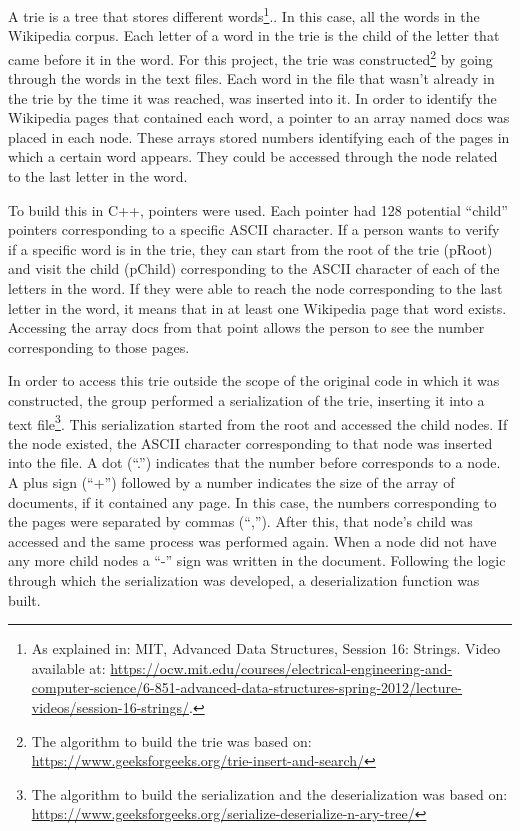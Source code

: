 \documentclass{article}
\begin{document}
A trie is a tree that stores different words\footnote{As explained in: MIT, Advanced Data Structures, Session 16: Strings. Video available at: \url{https://ocw.mit.edu/courses/electrical-engineering-and-computer-science/6-851-advanced-data-structures-spring-2012/lecture-videos/session-16-strings/}.}.. In this case, all the words in the Wikipedia corpus. Each letter of a word in the trie is the child of the letter that came before it in the word. 
For this project, the trie was constructed\footnote{The algorithm to build the trie was based on: \url{https://www.geeksforgeeks.org/trie-insert-and-search/}} by going through the words in the text files. Each word in the file that wasn't already in the trie by the time it was reached, was inserted into it. In order to identify the Wikipedia pages that contained each word, a pointer to an array named docs was placed in each node. These arrays stored numbers identifying each of the pages in which a certain word appears. They could be accessed through the node related to the last letter in the word. 

To build this in C++, pointers were used. Each pointer had 128 potential ``child'' pointers corresponding to a specific ASCII character. If a person wants to verify if a specific word is in the trie, they can start from the root of the trie (pRoot) and visit the child (pChild) corresponding to the ASCII character of each of the letters in the word. If they were able to reach the node corresponding to the last letter in the word, it means that in at least one Wikipedia page that word exists. Accessing the array docs from that point allows the person to see the number corresponding to those pages.


In order to access this trie outside the scope of the original code in which it was constructed, the group performed a serialization of the trie, inserting it into a text file\footnote{The algorithm to build the serialization and the deserialization was based on: \url{https://www.geeksforgeeks.org/serialize-deserialize-n-ary-tree/}}. This serialization started from the root and accessed the child nodes. If the node existed, the ASCII character corresponding to that node was inserted into the file. A dot (``.'') indicates that the number before corresponds to a node. A plus sign (``+'') followed by a number indicates the size of the array of documents, if it contained any page. In this case, the numbers corresponding to the pages were separated by commas (``,''). After this, that node's child was accessed and the same process was performed again. When a node did not have any more child nodes a ``-'' sign was written in the document. Following the logic through which the serialization was developed, a deserialization function was built. 
\end{document}
